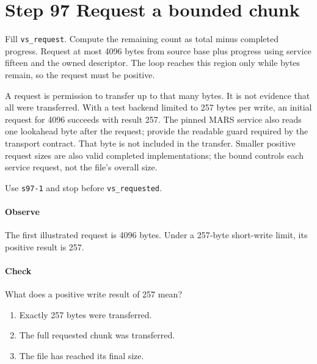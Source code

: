 \section{Step 97 Request a bounded chunk}
Fill \texttt{vs\_request}. Compute the remaining count as total minus completed progress. Request at most 4096 bytes from source base plus progress using service fifteen and the owned descriptor. The loop reaches this region only while bytes remain, so the request must be positive.

A request is permission to transfer up to that many bytes. It is not evidence that all were transferred. With a test backend limited to 257 bytes per write, an initial request for 4096 succeeds with result 257. The pinned MARS service also reads one lookahead byte after the request; provide the readable guard required by the transport contract. That byte is not included in the transfer. Smaller positive request sizes are also valid completed implementations; the bound controls each service request, not the file's overall size.

Use \texttt{s97-1} and stop before \texttt{vs\_requested}.

\paragraph{Observe} The first illustrated request is 4096 bytes. Under a 257-byte short-write limit, its positive result is 257.

\paragraph{Check} What does a positive write result of 257 mean?
\begin{enumerate}[label=\Alph*.]
\item Exactly 257 bytes were transferred.
\item The full requested chunk was transferred.
\item The file has reached its final size.
\end{enumerate}
